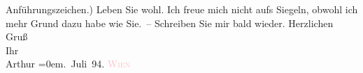                     Anführungszeichen.)\pend
           \pstart
           Leben Sie wohl. Ich freue {\pb}mich nicht aufs
                    Siegeln, obwohl ich mehr Grund dazu habe wie Sie. –\pend
           \pstart
           Schreiben Sie mir bald wieder. Herzlichen Gruß{\\[\baselineskip]}Ihr{\\[\baselineskip]}\spacefill\mbox{Arthur}\pend
           \leftskip=0em{}. Juli 94. \textsc{\textcolor{pink}{Wien}{}\ledrightnote{\textcolor{pink}{Wien}}}\pend
           \endnumbering{}  
      